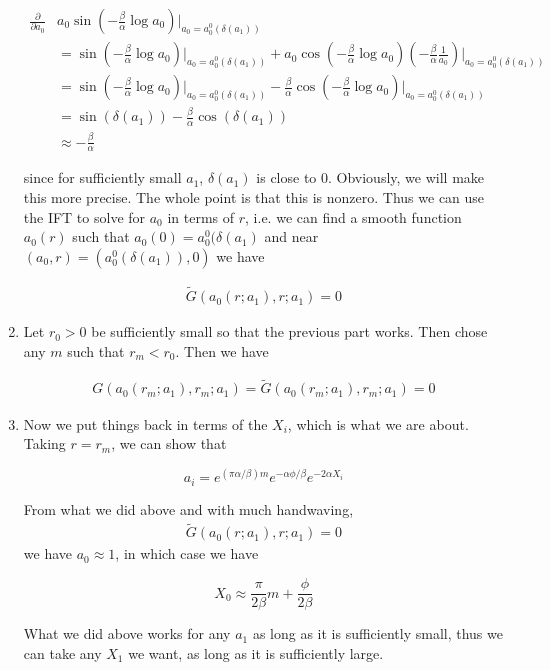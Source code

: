 \documentclass[12pt]{article}
\begin{document}
\begin{enumerate}
\begin{align*}
\frac{\partial}{\partial a_0} &a_0 \sin \left( -\frac{\beta}{\alpha} \log a_0 \right)\Big|_{a_0 = a_0^0(\delta(a_1))} \\
&= \sin \left( - \frac{\beta}{\alpha} \log a_0 \right)\Big|_{a_0 = a_0^0(\delta(a_1))}  + a_0 \cos \left( - \frac{\beta}{\alpha} \log a_0 \right)\left( -\frac{\beta}{\alpha} \frac{1}{a_0} \right) \Big|_{a_0 = a_0^0(\delta(a_1))} \\
&= \sin \left( - \frac{\beta}{\alpha} \log a_0 \right) \Big|_{a_0 = a_0^0(\delta(a_1))}  -\frac{\beta}{\alpha} \cos \left( - \frac{\beta}{\alpha} \log a_0 \right) \Big|_{a_0 = a_0^0(\delta(a_1))} \\
&= \sin \left( \delta(a_1) \right) -\frac{\beta}{\alpha} \cos \left( \delta(a_1) \right) \\
&\approx -\frac{\beta}{\alpha}
\end{align*}

since for sufficiently small $a_1$, $\delta(a_1)$ is close to 0. Obviously, we will make this more precise. The whole point is that this is nonzero. Thus we can use the IFT to solve for $a_0$ in terms of $r$, i.e. we can find a smooth function $a_0(r)$ such that $a_0(0) = a_0^0(\delta(a_1)$ and near $(a_0, r) = (a_0^0(\delta(a_1)), 0)$ we have

\begin{align*}
\tilde{G}(a_0(r; a_1), r; a_1) = 0
\end{align*}

\item Let $r_0 > 0$ be sufficiently small so that the previous part works. Then chose any $m$ such that $r_m < r_0$. Then we have

\begin{align*}
G(a_0(r_m; a_1), r_m; a_1) = \tilde{G}(a_0(r_m; a_1), r_m; a_1) = 0
\end{align*}

\item Now we put things back in terms of the $X_i$, which is what we are about. Taking $r = r_m$, we can show that

\[
a_i = e^{(\pi \alpha / \beta) m} e^{-\alpha \phi / \beta}e^{-2 \alpha X_i}
\]

From what we did above and with much handwaving,\begin{align*}
\tilde{G}(a_0(r; a_1), r; a_1) = 0
\end{align*} we have $a_0 \approx 1$, in which case we have

\[
X_0 \approx \frac{\pi}{2 \beta} m + \frac{\phi}{2 \beta}
\]

What we did above works for any $a_1$ as long as it is sufficiently small, thus we can take any $X_1$ we want, as long as it is sufficiently large.

\end{enumerate}
\end{document}
